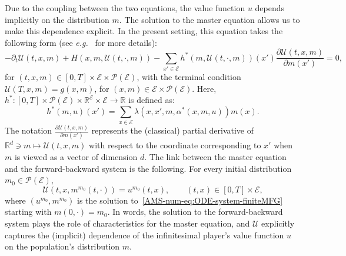 \documentclass{amsproc}
\theoremstyle{definition}
\theoremstyle{remark}
\numberwithin{equation}{section}
\newcommand{\RR}{{\mathbb R}}
\newcommand{\cE}{{\mathcal E}}
\newcommand{\cP}{{\mathcal P}}
\newcommand{\cU}{{\mathcal U}}
\newcommand{\ctrl}{\alpha}
\begin{document}
 Due to the coupling between the two equations, the value function $u$ depends implicitly on the distribution $m$. The solution to the master equation allows us to make this dependence explicit. In the present setting, this equation takes the following form (see \textit{e.g.}~\cite[section 7.2]{MR3752669} for more details):
 \begin{equation}
 \label{AMS-num-eq:master-finiteMFG}
 	-\partial_t \cU(t,x,m) 
	+ H(x,m,\cU(t, \cdot, m))
	- \sum_{x' \in \cE} h^*(m ,\cU(t, \cdot, m))(x') \frac{\partial \cU(t, x ,m)}{\partial m(x')} = 0, 
 \end{equation}
for $(t,x,m) \in [0,T] \times \cE \times \cP(\cE)$, with the terminal condition $\cU(T,x,m) = g(x,m)$, for $(x,m) \in \cE \times \cP(\cE)$. Here, $h^*: [0,T] \times \cP(\cE) \times \RR^\cE \times \cE \to \RR$ is defined as:
$$
	h^*(m, u)(x') = \sum_{x \in \cE} \lambda(x, x', m, \ctrl^*(x, m, u)) m(x).
$$
The notation $\frac{\partial \cU(t, x ,m)}{\partial m(x')}$ represents the (classical) partial derivative of $\RR^d \ni m \mapsto \cU(t,x,m)$ with respect to the coordinate corresponding to $x'$ when $m$ is viewed as a vector of dimension $d$. The link between the master equation and the forward-backward system is the following. For every initial distribution $m_0 \in \cP(\cE)$, 
\begin{equation}
\label{AMS-num-eq:finiteMFG-link-U-u}
	\cU(t,x, m^{m_0}(t, \cdot)) = u^{m_0}(t,x), \qquad (t,x) \in [0,T] \times \cE,
\end{equation}
where $(u^{m_0}, m^{m_0})$ is the solution to~\eqref{AMS-num-eq:ODE-system-finiteMFG} starting with $m(0,\cdot) = m_0$. In words, the solution to the forward-backward system plays the role of characteristics for the master equation, and $\cU$ explicitly captures the (implicit) dependence of the infinitesimal player's value function $u$ on the population's distribution $m$.
\end{document}
